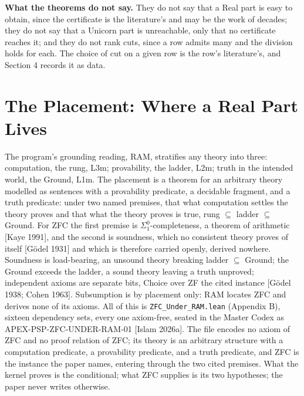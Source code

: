 \documentclass[10pt]{article}
\begin{document}
\textbf{What the theorems do not say.} They do not say that a Real part
is easy to obtain, since the certificate is the literature's and may be
the work of decades; they do not say that a Unicorn part is unreachable,
only that no certificate reaches it; and they do not rank cuts, since a
row admits many and the division holds for each. The choice of cut on a
given row is the row's literature's, and Section 4 records it as data.

\hypertarget{the-placement-where-a-real-part-lives}{%
\section{The Placement: Where a Real Part
Lives}\label{the-placement-where-a-real-part-lives}}

The program's grounding reading, RAM, stratifies any theory into three:
computation, the rung, L3m; provability, the ladder, L2m; truth in the
intended world, the Ground, L1m. The placement is a theorem for an
arbitrary theory modelled as sentences with a provability predicate, a
decidable fragment, and a truth predicate: under two named premises,
that what computation settles the theory proves and that what the theory
proves is true, rung \(\subseteq\) ladder \(\subseteq\) Ground. For ZFC
the first premise is \(\Sigma^0_1\)-completeness, a theorem of
arithmetic {[}Kaye 1991{]}, and the second is soundness, which no
consistent theory proves of itself {[}Gödel 1931{]} and which is
therefore carried openly, derived nowhere. Soundness is load-bearing, an
unsound theory breaking ladder \(\subseteq\) Ground; the Ground exceeds
the ladder, a sound theory leaving a truth unproved; independent axioms
are separate bits, Choice over ZF the cited instance {[}Gödel 1938;
Cohen 1963{]}. Subsumption is by placement only: RAM locates ZFC and
derives none of its axioms. All of this is \texttt{ZFC\_Under\_RAM.lean}
(Appendix B), sixteen dependency sets, every one axiom-free, seated in
the Master Codex as APEX-PSP-ZFC-UNDER-RAM-01 {[}Islam 2026a{]}. The
file encodes no axiom of ZFC and no proof relation of ZFC; its theory is
an arbitrary structure with a computation predicate, a provability
predicate, and a truth predicate, and ZFC is the instance the paper
names, entering through the two cited premises. What the kernel proves
is the conditional; what ZFC supplies is its two hypotheses; the paper
never writes otherwise.
\end{document}
